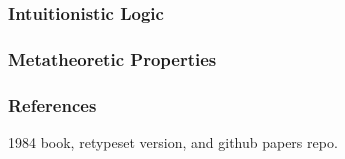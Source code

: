 \documentclass[mathserif]{beamer}
\begin{document}
\begin{frame}
\frametitle{Intuitionistic Logic}


\end{frame}

\begin{frame}
\frametitle{Metatheoretic Properties}

\end{frame}

\begin{frame}
\frametitle{References}

1984 book, retypeset version,
and github papers repo.

\end{frame}
\end{document}
